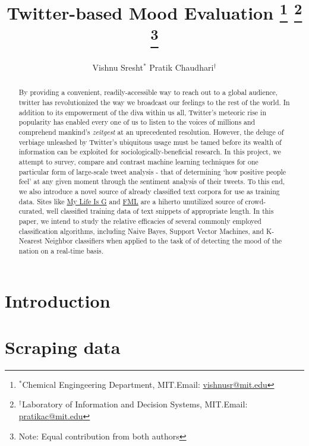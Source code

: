 \documentclass[11pt, letterpaper, conference, final, twocolumn]{ieeeconf}
\begin{document}
\title{\bf Twitter-based Mood Evaluation
	\thanks{$^*$Chemical Engingeering Department, MIT.\newline Email: \href{mailto:vishnusr@mit.edu}{vishnusr@mit.edu}}
	\thanks{$^\dag$Laboratory of Information and Decision Systems, MIT.\newline Email: \href{mailto:pratikac@mit.edu}{pratikac@mit.edu}}
	\thanks{Note: Equal contribution from both authors}
}
\author{Vishnu Sresht$^*$ \qquad Pratik Chaudhari$^\dag$}
\maketitle

\begin{abstract}
By providing a convenient, readily-accessible way to reach out to a global audience, twitter has revolutionized the way we broadcast our feelings to the rest of the world. In addition to its empowerment of the diva within us all, Twitter's meteoric rise in popularity has enabled every one of us to listen to the voices of millions and comprehend mankind's \textit{zeitgest} at an uprecedented resolution. However, the deluge of verbiage unleashed by Twitter's ubiquitous usage must be tamed before its wealth of information can be exploited for sociologically-beneficial research. In this project, we attempt to survey, compare and contrast machine learning techniques for one particular form of large-scale tweet analysis - that of determining `how positive people feel' at any given moment through the sentiment analysis of their tweets. To this end, we also introduce a novel source of already classified text corpora for use as training data. Sites like \href{http://mylifeisg.com}{My Life Is G} and \href{http://fmylife.com}{FML} are a hiherto unutilized source of crowd-curated, well classified training data of text snippets of appropriate length. In this paper, we intend to study the relative efficacies of several commonly employed classification algorithms, including Naive Bayes, Support Vector Machines, and K-Nearest Neighbor classifiers when applied to the task of of detecting the mood of the nation on a real-time basis.
\end{abstract}

\section{Introduction}
\label{sec:intro}



\section{Scraping data}
\label{sec:data}
\end{document}
